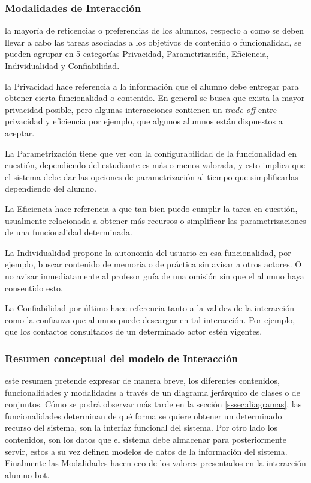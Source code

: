     \subsubsection{Modalidades de Interacción}
    \label{sssec:cualidades}
    \par la mayoría de reticencias o preferencias de los alumnos, respecto a como se deben llevar a cabo las tareas asociadas a los objetivos de contenido o funcionalidad, se pueden agrupar en 5 categorías Privacidad, Parametrización, Eficiencia, Individualidad y Confiabilidad.
    \par la Privacidad hace referencia a la información que el alumno debe entregar para obtener cierta funcionalidad o contenido. En general se busca que exista la mayor privacidad posible, pero algunas interacciones contienen un \textit{trade-off} entre privacidad y eficiencia por ejemplo, que algunos alumnos están dispuestos a aceptar.
    \par La Parametrización tiene que ver con la configurabilidad de la funcionalidad en cuestión, dependiendo del estudiante es más o menos valorada, y esto implica que el sistema debe dar las opciones de parametrización al tiempo que simplificarlas dependiendo del alumno.
    \par La Eficiencia hace referencia a que tan bien puedo cumplir la tarea en cuestión, usualmente relacionada a obtener más recursos o simplificar las parametrizaciones de una funcionalidad determinada.
    \par La Individualidad propone la autonomía del usuario en esa funcionalidad, por ejemplo, buscar contenido de memoria o de práctica sin avisar a otros actores. O no avisar inmediatamente al profesor guía de una omisión sin que el alumno haya consentido esto.
    \par La Confiabilidad por último hace referencia tanto a la validez de la interacción como la confianza que alumno puede descargar en tal interacción. Por ejemplo, que los contactos consultados de un determinado actor estén vigentes.
    
    \subsubsection{Resumen conceptual del modelo de Interacción}
    \par este resumen pretende expresar de manera breve, los diferentes contenidos, funcionalidades y modalidades a través de un diagrama jerárquico de clases o de conjuntos. Cómo se podrá observar más tarde en la sección \ref{sssec:diagramas}, las funcionalidades determinan de qué forma se quiere obtener un determinado recurso del sistema, son la interfaz funcional del sistema. Por otro lado los contenidos, son los datos que el sistema debe almacenar para posteriormente servir, estos a su vez definen modelos de datos de la información del sistema. Finalmente las Modalidades hacen eco de los valores presentados en la interacción alumno-bot.
    
